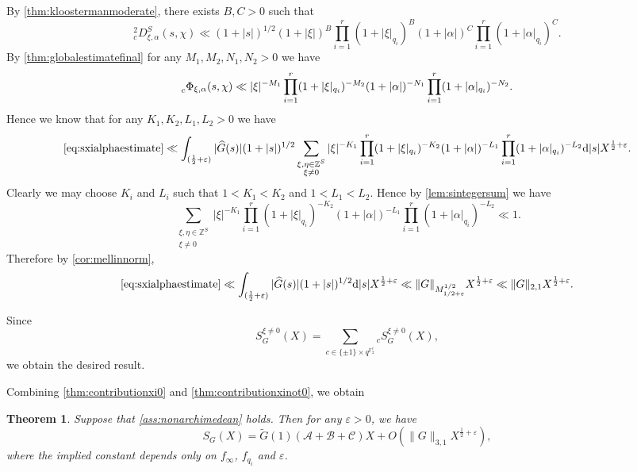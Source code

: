 \documentclass[10pt,oneside,reqno]{amsart}
\makeatletter
\newcommand\rmd{\mathrm{d}}
\newcommand\FF{\mathbb{F}}
\newcommand\ZZ{\mathbb{Z}}
\newcommand\ms[1]{\mathscr{#1}}
\theoremstyle{THEOREM}
\newtheorem{theorem}{Theorem}[section]
\theoremstyle{DEFINITION}
\theoremstyle{EXERCISE}
\numberwithin{equation}{section}
\renewenvironment{proof}[1][\proofname]{\par
  \vspace{-6pt}
  \pushQED{\qed}
  \normalfont \topsep6\p@\@plus6\p@\relax
  \trivlist
  \item[\hskip\labelsep\rmfamily\bfseries
    #1\@addpunct{:}]\ignorespaces
}{
  \popQED\endtrivlist\@endpefalse
  \vspace{-6pt}
}
\makeatother
\begin{document}
\begin{proof}
By \autoref{thm:kloostermanmoderate}, there exists $B,C>0$ such that 
\[
{}^2_c D_{\xi,\alpha}^S(s,\chi)\ll (1+|s|)^{1/2}(1+|\xi|)^B\prod_{i=1}^{r}(1+|\xi|_{q_i})^B (1+|\alpha|)^C\prod_{i=1}^{r}(1+|\alpha|_{q_i})^C.
\]
By \autoref{thm:globalestimatefinal} for any $M_1,M_2,N_1,N_2>0$ we have
\[
\prescript{}{c}\Phi_{\xi,\alpha}(s,\chi)\ll|\xi|^{-M_1}\prod_{i=1}^{r}(1+|\xi|_{q_i})^{-M_2}(1+|\alpha|)^{-N_1} \prod_{i=1}^{r}(1+|\alpha|_{q_i})^{-N_2}.
\]
Hence we know that for any $K_1,K_2,L_1,L_2>0$ we have
\[
\eqref{eq:sxialphaestimate}\ll \int_{(\frac12+\varepsilon)}|\widehat{G}(s)|(1+|s|)^{1/2}\sum_{\substack{\xi,\eta\in \ZZ^S\\\xi\neq 0}}|\xi|^{-K_1} \prod_{i=1}^{r}(1+|\xi|_{q_i})^{-K_2}(1+|\alpha|)^{-L_1} \prod_{i=1}^{r}(1+|\alpha|_{q_i})^{-L_2}\rmd |s| X^{\frac12+\varepsilon}.
\]
Clearly we may choose $K_i$ and $L_i$ such that $1<K_1<K_2$ and $1<L_1<L_2$. Hence by \autoref{lem:sintegersum} we have
\[
\sum_{\substack{\xi,\eta\in \ZZ^S\\\xi\neq 0}}|\xi|^{-K_1} \prod_{i=1}^{r}(1+|\xi|_{q_i})^{-K_2}(1+|\alpha|)^{-L_1} \prod_{i=1}^{r}(1+|\alpha|_{q_i})^{-L_2}\ll 1.
\]
Therefore by \autoref{cor:mellinnorm},
\[
\eqref{eq:sxialphaestimate}\ll \int_{(\frac12+\varepsilon)}|\widehat{G}(s)|(1+|s|)^{1/2}\rmd |s|X^{\frac12+\varepsilon}\ll \|G\|_{M_{1/2+\varepsilon}^{1/2}}X^{\frac12+\varepsilon}\ll \|G\|_{2,1}X^{\frac12+\varepsilon}.
\]

Since
\[
S_G^{\xi\neq 0}(X)=\sum_{c\in \{\pm 1\}\times q^{\FF_2^r}}{}_cS_G^{\xi\neq 0}(X),
\]
we obtain the desired result.
\end{proof}

Combining \autoref{thm:contributionxi0} and \autoref{thm:contributionxinot0}, we obtain

\begin{theorem}\label{thm:contributionxig}
Suppose that \autoref{ass:nonarchimedean} holds. Then for any $\varepsilon>0$, we have
\[
S_G(X)=\widetilde{G}(1)(\ms{A}+\ms{B}+\ms{C})X+O(\|G\|_{3,1}X^{\frac{1}{2}+\varepsilon}),
\]
where the implied constant depends only on $f_\infty$, $f_{q_i}$ and $\varepsilon$.
\end{theorem}
\end{document}
